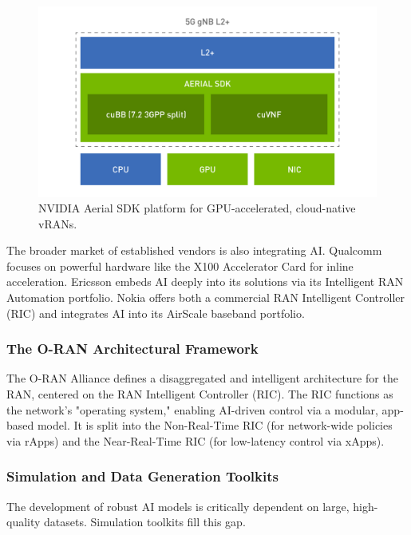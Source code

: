 \documentclass[conference]{IEEEtran}
\begin{document}
\begin{figure}[htbp]
\centerline{\includegraphics[width=0.9\columnwidth]{images/nvidia_aerial_sdk.jpg}}
\caption{NVIDIA Aerial SDK platform for GPU-accelerated, cloud-native vRANs.}
\label{fig:nvidia_aerial_sdk}
\end{figure}

The broader market of established vendors is also integrating AI. Qualcomm focuses on powerful hardware like the X100 Accelerator Card for inline acceleration. Ericsson embeds AI deeply into its solutions via its Intelligent RAN Automation portfolio. Nokia offers both a commercial RAN Intelligent Controller (RIC) and integrates AI into its AirScale baseband portfolio.

\subsubsection{The O-RAN Architectural Framework}
The O-RAN Alliance defines a disaggregated and intelligent architecture for the RAN, centered on the RAN Intelligent Controller (RIC). The RIC functions as the network's "operating system," enabling AI-driven control via a modular, app-based model. It is split into the Non-Real-Time RIC (for network-wide policies via rApps) and the Near-Real-Time RIC (for low-latency control via xApps).

\subsubsection{Simulation and Data Generation Toolkits}
The development of robust AI models is critically dependent on large, high-quality datasets. Simulation toolkits fill this gap.
\end{document}
